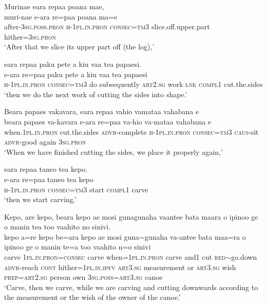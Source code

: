 \ea\label{ex:text16-10}
Murinae eara repaa poana mae,\\
\gll muri-nae	e-ara	re=paa	poana	ma=e\\
     after-3\textsc{sg}.\textsc{poss}.\textsc{pron}	\textsc{h}-1\textsc{pl}.\textsc{in}.\textsc{pron}	\textsc{consec}=\textsc{tm}3	slice.off.upper.part	hither=3\textsc{sg}.\textsc{pron}\\
\glt `After that we slice its upper part off (the log),'
\z

\ea\label{ex:text16-11}
eara repaa paku pete a kiu vaa tea papaesi.\\
\gll e-ara	re=paa	paku	pete	a	kiu	vaa	tea	papaesi\\
     \textsc{h}-1\textsc{pl}.\textsc{in}.\textsc{pron}	\textsc{consec}=\textsc{tm}3	do	subsequently	\textsc{art}2.\textsc{sg}	work	\textsc{lnk}	\textsc{compl}1	cut.the.sides\\
\glt `then we do the next work of cutting the sides into shape.'
\z

\ea\label{ex:text16-12}
Beara papaes vakavara, eara repaa vahio vamataa vahabana e\\
\gll beara	papaes	va-kavara	e-ara	re=paa	va-hio	va-mataa	vahabana	e\\
     when.1\textsc{pl}.\textsc{in}.\textsc{pron}	cut.the.sides	\textsc{advr}-complete	\textsc{h}-1\textsc{pl}.\textsc{in}.\textsc{pron}	\textsc{consec}=\textsc{tm}3	\textsc{caus}-sit	\textsc{advr}-good	again	3\textsc{sg}.\textsc{pron}\\
\glt `When we have finished cutting the sides, we place it properly again,'
\z

\ea\label{ex:text16-13}
eara repaa taneo tea kepo.\\
\gll e-ara	re=paa	taneo	tea	kepo\\
     \textsc{h}-1\textsc{pl}.\textsc{in}.\textsc{pron}	\textsc{consec}=\textsc{tm}3	start	\textsc{compl}1	carve\\
\glt `then we start carving.'
\z

\ea\label{ex:text16-14}
Kepo, are kepo, beara kepo ae mosi gunagunaha vaantee bata maara o ipinoo ge o manin tea too vaahito no sinivi.\\
\gll kepo	a=re	kepo	be=ara	kepo	ae	mosi	guna{$\sim$}gunaha	va-antee	bata	maa=ra	o	ipinoo	ge	o	manin	te=a	too	vaahito	n=o	sinivi\\
     carve	1\textsc{pl}.\textsc{in}.\textsc{pron}=\textsc{consec}	carve	when=1\textsc{pl}.\textsc{in}.\textsc{pron}	carve	and1	cut	\textsc{red}{$\sim$}go.down	\textsc{advr}-reach	\textsc{cont}	hither=1\textsc{pl}.\textsc{in}.\textsc{ipfv}	\textsc{art}3.\textsc{sg}	measurement	or	\textsc{art}3.\textsc{sg}	wish	\textsc{prep}=\textsc{art}2.\textsc{sg}	person	own	3\textsc{sg}.\textsc{poss}=\textsc{art}3.\textsc{sg}	canoe\\
\glt `Carve, then we carve, while we are carving and cutting downwards according to the measurement or the wish of the owner of the canoe.'
\z

